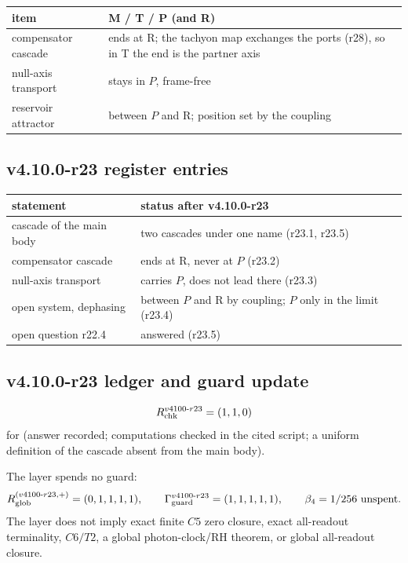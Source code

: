 \begin{center}
\small
\begin{tabular}{@{}>{\raggedright\arraybackslash}p{}>{\raggedright\arraybackslash}p{}@{}}
\toprule
item & M / T / P (and R)\\
\midrule
compensator cascade & ends at R; the tachyon map exchanges the ports (r28), so in T the end is the partner axis\\
null-axis transport & stays in \(P\), frame-free\\
reservoir attractor & between \(P\) and R; position set by the coupling\\
\bottomrule
\end{tabular}
\end{center}

\subsection*{v4.10.0-r23 register entries}
\label{subsec:v4100-r23-register}

\begin{center}
\small
\begin{tabular}{@{}>{\raggedright\arraybackslash}p{}>{\raggedright\arraybackslash}p{}@{}}
\toprule
statement & status after v4.10.0-r23\\
\midrule
cascade of the main body & two cascades under one name (r23.1, r23.5)\\
compensator cascade & ends at R, never at \(P\) (r23.2)\\
null-axis transport & carries \(P\), does not lead there (r23.3)\\
open system, dephasing & between \(P\) and R by coupling; \(P\) only in the limit (r23.4)\\
open question r22.4 & answered (r23.5)\\
\bottomrule
\end{tabular}
\end{center}

\subsection*{v4.10.0-r23 ledger and guard update}
\label{subsec:v4100-r23-ledger-guard}

\[
R_{\rm chk}^{v4100\text{-}r23}=(1,1,0)
\]
for (answer recorded; computations checked in the cited script; a uniform definition of the cascade absent from the main body).

The layer spends no guard:
\[
R_{\rm glob}^{(v4100\text{-}r23,+)}=(0,1,1,1,1),
\qquad
\Gamma_{\rm guard}^{v4100\text{-}r23}=(1,1,1,1,1),
\qquad
\beta_4=1/256\ \text{unspent}.
\]
The layer does not imply exact finite \(C5\) zero closure, exact all-readout terminality, \(C6/T2\), a global photon-clock/RH theorem,
or global all-readout closure.
